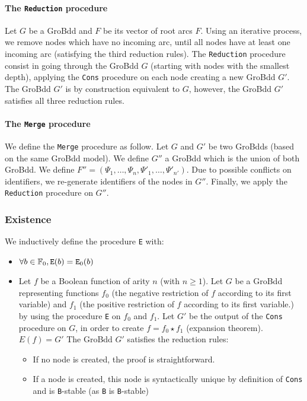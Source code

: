 \documentclass[a4paper,10pt]{article}
\begin{document}
\paragraph{The \texttt{Reduction} procedure\\}
Let $G$ be a GroBdd and $F$ be its vector of root arcs $F$.
Using an iterative process, we remove nodes which have no incoming arc, until all nodes have at least one incoming arc (satisfying the third reduction rules).
The \texttt{Reduction} procedure consist in going through the GroBdd $G$ (starting with nodes with the smallest depth), applying the \texttt{Cons} procedure on each node creating a new GroBdd $G'$.
The GroBdd $G'$ is by construction equivalent to $G$, however, the GroBdd $G'$ satisfies all three reduction rules.

\paragraph{The \texttt{Merge} procedure\\}
We define the \texttt{Merge} procedure as follow.
Let $G$ and $G'$ be two GroBdds (based on the same GroBdd model).
We define $G''$ a GroBdd which is the union of both GroBdd.
We define $F'' = (\Psi_1, \dots, \Psi_n, \Psi'_1, \dots, \Psi'_{n'})$.
Due to possible conflicts on identifiers, we re-generate identifiers of the nodes in $G''$.
Finally, we apply the \texttt{Reduction} procedure on $G''$.

\subsubsection{Existence}
We inductively define the procedure \texttt{E} with:\begin{itemize}
\item $\forall b\in\mathbb{F}_0, \texttt{E}(b) = \texttt{E}_0(b)$
\item
Let $f$ be a Boolean function of arity $n$ (with $n \geq 1$).
Let $G$ be a GroBdd representing functions $f_0$ (the negative restriction of $f$ according to its first variable) and $f_1$ (the positive restriction of $f$ according to its first variable.) by using the procedure \texttt{E} on $f_0$ and $f_1$.
Let $G'$ be the output of the \texttt{Cons} procedure on $G$, in order to create $f = f_0 \star f_1$ (expansion theorem).\\
$E(f) = G'$
The GroBdd $G'$ satisfies the reduction rules:\begin{itemize}
\item If no node is created, the proof is straightforward.
\item If a node is created, this node is syntactically unique by definition of \texttt{Cons} and is \texttt{B}-stable  (as \texttt{B} is \texttt{B}-stable)
\end{itemize}
\end{itemize}
\end{document}
